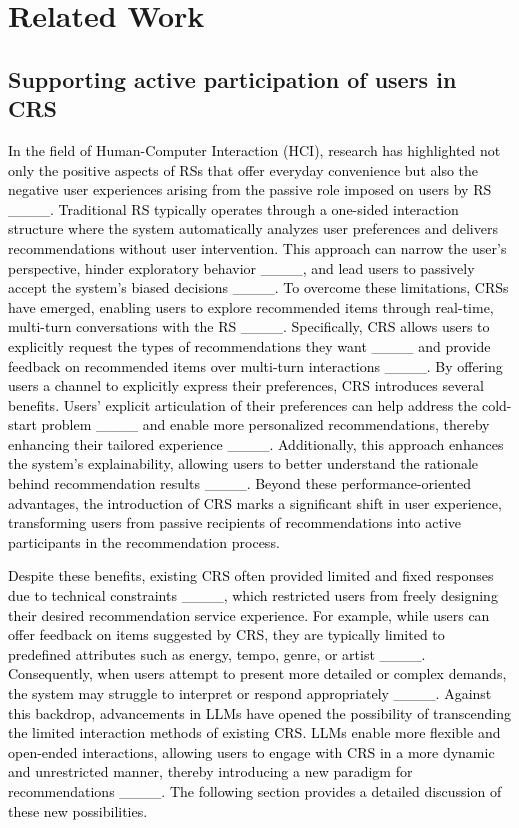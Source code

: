 \section{Related Work}
\subsection{Supporting active participation of users in CRS}

\textcolor{black}{In the field of Human-Computer Interaction (HCI), research has highlighted not only the positive aspects of RSs that offer everyday convenience but also the negative user experiences arising from the passive role imposed on users by RS ____. Traditional RS typically operates through a one-sided interaction structure where the system automatically analyzes user preferences and delivers recommendations without user intervention. This approach can narrow the user’s perspective, hinder exploratory behavior ____, and lead users to passively accept the system's biased decisions ____. To overcome these limitations, CRSs have emerged, enabling users to explore recommended items through real-time, multi-turn conversations with the RS ____. Specifically, CRS allows users to explicitly request the types of recommendations they want ____ and provide feedback on recommended items over multi-turn interactions ____. By offering users a channel to explicitly express their preferences, CRS introduces several benefits. Users’ explicit articulation of their preferences can help address the cold-start problem ____ and enable more personalized recommendations, thereby enhancing their tailored experience ____. Additionally, this approach enhances the system's explainability, allowing users to better understand the rationale behind recommendation results ____. Beyond these performance-oriented advantages, the introduction of CRS marks a significant shift in user experience, transforming users from passive recipients of recommendations into active participants in the recommendation process. }

\textcolor{black}{Despite these benefits, existing CRS often provided limited and fixed responses due to technical constraints ____, which restricted users from freely designing their desired recommendation service experience. For example, while users can offer feedback on items suggested by CRS, they are typically limited to predefined attributes such as energy, tempo, genre, or artist ____. Consequently, when users attempt to present more detailed or complex demands, the system may struggle to interpret or respond appropriately ____. Against this backdrop, advancements in LLMs have opened the possibility of transcending the limited interaction methods of existing CRS. LLMs enable more flexible and open-ended interactions, allowing users to engage with CRS in a more dynamic and unrestricted manner, thereby introducing a new paradigm for recommendations ____. The following section provides a detailed discussion of these new possibilities. }


